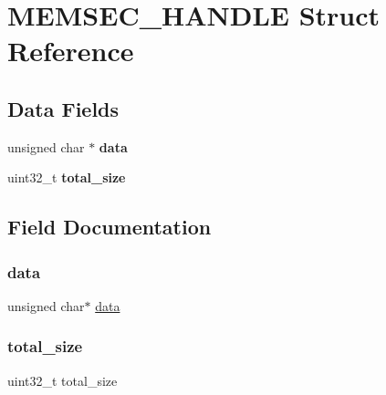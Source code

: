 \hypertarget{struct_m_e_m_s_e_c___h_a_n_d_l_e}{}\section{M\+E\+M\+S\+E\+C\+\_\+\+H\+A\+N\+D\+LE Struct Reference}
\label{struct_m_e_m_s_e_c___h_a_n_d_l_e}
\subsection*{Data Fields}
\begin{DoxyCompactItemize}
\item
\hypertarget{struct_m_e_m_s_e_c___h_a_n_d_l_e_ac24cea2bfcc927fd29bc74d1086707d8}{}\label{struct_m_e_m_s_e_c___h_a_n_d_l_e_ac24cea2bfcc927fd29bc74d1086707d8}
unsigned char $\ast$ {\bfseries data}
\item
\hypertarget{struct_m_e_m_s_e_c___h_a_n_d_l_e_acdfd526bb392e1ee59a3c6c545891b48}{}\label{struct_m_e_m_s_e_c___h_a_n_d_l_e_acdfd526bb392e1ee59a3c6c545891b48}
uint32\+\_\+t {\bfseries total\+\_\+size}
\end{DoxyCompactItemize}


\subsection{Field Documentation}
\hypertarget{struct_m_e_m_s_e_c___h_a_n_d_l_e_ac24cea2bfcc927fd29bc74d1086707d8}{}\label{struct_m_e_m_s_e_c___h_a_n_d_l_e_ac24cea2bfcc927fd29bc74d1086707d8}
\subsubsection{\texorpdfstring{data}{data}}
{\footnotesize\ttfamily unsigned char$\ast$ \hyperlink{structdata}{data}}

\hypertarget{struct_m_e_m_s_e_c___h_a_n_d_l_e_acdfd526bb392e1ee59a3c6c545891b48}{}\label{struct_m_e_m_s_e_c___h_a_n_d_l_e_acdfd526bb392e1ee59a3c6c545891b48}
\subsubsection{\texorpdfstring{total\+\_\+size}{total\_size}}
{\footnotesize\ttfamily uint32\+\_\+t total\+\_\+size}

